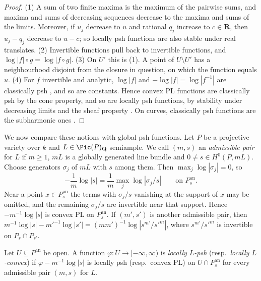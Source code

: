 \documentclass[11pt,a4paper]{article}
\newcommand{\an}{\mathrm{an}}          %
\begin{document}
\begin{proof}
(1) A sum of two finite maxima is the maximum of the pairwise sums, and maxima and sums of decreasing sequences decrease to the maxima and sums of the limits. Moreover, if $u_j$ decrease to $u$ and rational $q_j$ increase to $c\in\mathbf R$, then $u_j-q_j$ decrease to $u-c$; so locally psh functions are also stable under real translates. (2) Invertible functions pull back to invertible functions, and $\log|f|\circ g=\log|f\circ g|$. (3) On $U'$ this is (1). A point of $U\setminus U'$ has a neighbourhood disjoint from the closure in question, on which the function equals $u$. (4) For $f$ invertible and analytic, $\log|f|$ and $-\log|f|=\log|f^{-1}|$ are classically psh \cite[Proposition~4.2(2)]{GublerRabinoff25}, and so are constants. Hence convex PL functions are classically psh by the cone property, and so are locally psh functions, by stability under decreasing limits and the sheaf property \cite[Proposition~4.2(1),(3),(4)]{GublerRabinoff25}. On curves, classically psh functions are the subharmonic ones \cite[\S4.1.2]{GublerRabinoff25}.
\end{proof}

We now compare these notions with global psh functions. Let $P$ be a projective variety over $k$ and $L\in\Pic(P)_{\mathbf Q}$ semiample. We call $(m,s)$ an \emph{admissible pair} for $L$ if $m\ge1$, $mL$ is a globally generated line bundle and $0\ne s\in H^0(P,mL)$. Choose generators $\sigma_j$ of $mL$ with $s$ among them. Then $\max_j\log|\sigma_j|=0$, so
\begin{equation}\label{eq:reference-potential}
-\frac1m\log|s|=\frac1m\max_j\log|\sigma_j/s|\qquad\text{on }P_s^{\an}.
\end{equation}
Near a point $x\in P_s^{\an}$ the terms with $\sigma_j/s$ vanishing at the support of $x$ may be omitted, and the remaining $\sigma_j/s$ are invertible near that support. Hence $-m^{-1}\log|s|$ is convex PL on $P_s^{\an}$. If $(m',s')$ is another admissible pair, then $m^{-1}\log|s|-m'^{-1}\log|s'|=(mm')^{-1}\log|s^{m'}/s'^m|$, where $s^{m'}/s'^m$ is invertible on $P_s\cap P_{s'}$.

\begin{definition}\label{def:locally-L-psh}
Let $U\subseteq P^{\an}$ be open. A function $\varphi\colon U\to[-\infty,\infty)$ is \emph{locally $L$-psh} \textup(resp.\ \emph{locally $L$-convex}\textup) if $\varphi-m^{-1}\log|s|$ is locally psh \textup(resp.\ convex PL\textup) on $U\cap P_s^{\an}$ for every admissible pair $(m,s)$ for $L$.
\end{definition}
\end{document}
